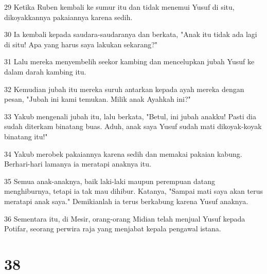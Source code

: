 \par 29 Ketika Ruben kembali ke sumur itu dan tidak menemui Yusuf di situ, dikoyakkannya pakaiannya karena sedih.
\par 30 Ia kembali kepada saudara-saudaranya dan berkata, "Anak itu tidak ada lagi di situ! Apa yang harus saya lakukan sekarang?"
\par 31 Lalu mereka menyembelih seekor kambing dan mencelupkan jubah Yusuf ke dalam darah kambing itu.
\par 32 Kemudian jubah itu mereka suruh antarkan kepada ayah mereka dengan pesan, "Jubah ini kami temukan. Milik anak Ayahkah ini?"
\par 33 Yakub mengenali jubah itu, lalu berkata, "Betul, ini jubah anakku! Pasti dia sudah diterkam binatang buas. Aduh, anak saya Yusuf sudah mati dikoyak-koyak binatang itu!"
\par 34 Yakub merobek pakaiannya karena sedih dan memakai pakaian kabung. Berhari-hari lamanya ia meratapi anaknya itu.
\par 35 Semua anak-anaknya, baik laki-laki maupun perempuan datang menghiburnya, tetapi ia tak mau dihibur. Katanya, "Sampai mati saya akan terus meratapi anak saya." Demikianlah ia terus berkabung karena Yusuf anaknya.
\par 36 Sementara itu, di Mesir, orang-orang Midian telah menjual Yusuf kepada Potifar, seorang perwira raja yang menjabat kepala pengawal istana.

\chapter{38}

